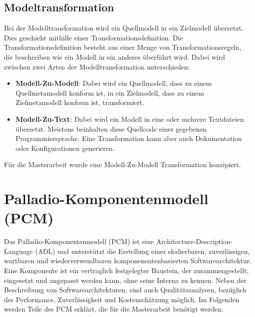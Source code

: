 \subsection{Modeltransformation}
Bei der Modelltransformation \cite{Kleppe03} wird ein Quellmodell in ein Zielmodell übersetzt. Dies geschieht mithilfe einer Transformationsdefinition. Die Transformationsdefinition besteht aus einer Menge von Transformationsregeln, die beschreiben wie ein Modell in ein anderes überführt wird. Dabei wird zwischen zwei Arten der Modelltransformation unterschieden:
\begin{itemize}
    \item \textbf{Modell-Zu-Modell}: Dabei wird ein Quellmodell, dass zu einem Quellmetamodell konform ist, in ein Zielmodell, dass zu einem Zielmetamodell konform ist, transformiert.
    \item \textbf{Modell-Zu-Text}: Dabei wird ein Modell in eine oder mehrere Textdateien übersetzt. Meistens beinhalten diese Quellcode einer gegebenen Programmiersprache. Eine Transformation kann aber auch Dokumentation oder Konfigurationen generieren.
\end{itemize}
Für die Masterarbeit wurde eine Modell-Zu-Modell Transformation konzipiert.

\section{Palladio-Komponentenmodell (PCM)}
\label{sec:palladio}
Das Palladio-Komponentenmodell (PCM) \cite{palladio17} ist eine Architecture-Description-Language (ADL) und unterstützt die Erstellung einer skalierbaren, zuverlässigen, wartbaren und wiederverwendbaren komponenentenbasierten Softwarearchitektur. Eine Komponente ist ein vertraglich festgelegter Baustein, der zusammengestellt, eingesetzt und angepasst werden kann, ohne seine Interna zu kennen. Neben der Beschreibung von Softwarearchitekturen, sind auch Qualitätsanalysen, bezüglich der Performance, Zuverlässigkeit und Kostenschätzung möglich. Im Folgenden werden Teile des PCM erklärt, die für die Masterarbeit benötigt werden.

